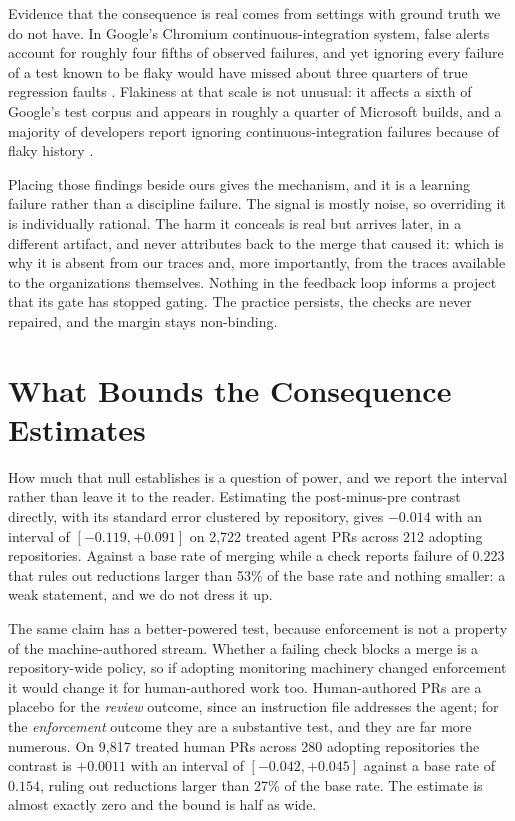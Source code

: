 \documentclass[mnsc]{informs4}
\begin{document}
Evidence that the consequence is real comes from settings with ground truth we do
not have. In Google's Chromium continuous-integration system, false alerts account
for roughly four fifths of observed failures, and yet ignoring every failure of a
test known to be flaky would have missed about three quarters of true regression
faults \citep{haben2023chromium}. Flakiness at that scale is not unusual: it
affects a sixth of Google's test corpus and appears in roughly a quarter of
Microsoft builds, and a majority of developers report ignoring
continuous-integration failures because of flaky history \citep{parry2021survey}.

Placing those findings beside ours gives the mechanism, and it is a learning
failure rather than a discipline failure. The signal is mostly noise, so overriding
it is individually rational. The harm it conceals is real but arrives later, in a
different artifact, and never attributes back to the merge that caused it: which
is why it is absent from our traces and, more importantly, from the traces
available to the organizations themselves. Nothing in the feedback loop informs a
project that its gate has stopped gating. The practice persists, the checks are
never repaired, and the margin stays non-binding.


\section{What Bounds the Consequence Estimates}
\label{ec:power}

How much that null establishes is a question of power, and we report the interval
rather than leave it to the reader. Estimating the post-minus-pre contrast directly,
with its standard error clustered by repository, gives $-0.014$ with an interval of
$[-0.119, +0.091]$ on 2,722 treated agent PRs across 212 adopting repositories. Against a base rate of merging while a check reports failure of $0.223$ that rules out reductions larger than 53\% of
the base rate and nothing smaller: a weak statement, and we do not dress it up.

The same claim has a better-powered test, because enforcement is not a property of
the machine-authored stream. Whether a failing check blocks a merge is a
repository-wide policy, so if adopting monitoring machinery changed enforcement it
would change it for human-authored work too. Human-authored PRs are a placebo for
the \emph{review} outcome, since an instruction file addresses the agent; for the
\emph{enforcement} outcome they are a substantive test, and they are far more
numerous. On 9,817 treated human PRs across 280 adopting repositories the contrast
is $+0.0011$ with an interval of $[-0.042, +0.045]$ against a base rate of $0.154$,
ruling out reductions larger than 27\% of the base rate. The estimate is almost
exactly zero and the bound is half as wide.
\end{document}
